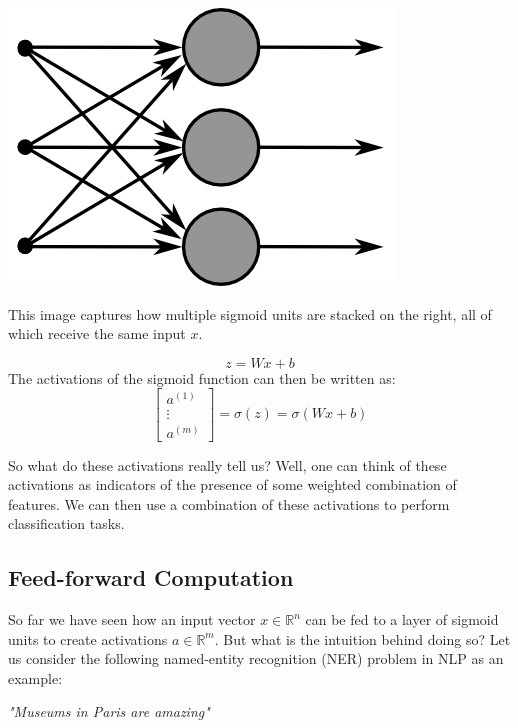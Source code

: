 \documentclass{tufte-handout}
\begin{document}
\begin{marginfigure}%
  \includegraphics[width=\linewidth]{SingleLayerNeuralNetwork}
  \caption{This image captures how multiple sigmoid units are stacked on the right, all of which receive the same input $x$.}
  \label{fig:SingleLayerNeuralNetwork}
\end{marginfigure}
$$z = Wx + b$$
The activations of the sigmoid function can then be written as:
$$\begin{bmatrix}  a^{(1)}\\ \vdots \\  a^{(m)} \end{bmatrix} = \sigma (z) = \sigma (Wx + b)$$

So what do these activations really tell us? Well, one can think of these activations as indicators of the presence of some weighted combination of features. We can then use a combination of these activations to perform classification tasks.

\subsection{Feed-forward Computation}\label{sec:ff}

So far we have seen how an input vector $x \in \mathbb{R}^n$ can be fed to a layer of sigmoid units to create activations $a \in \mathbb{R}^m$. But what is the intuition behind doing so? Let us consider the following named-entity recognition (NER) problem in NLP as an example:

\begin{center}
\textit{"Museums in Paris are amazing"}
\end{center}
\end{document}
